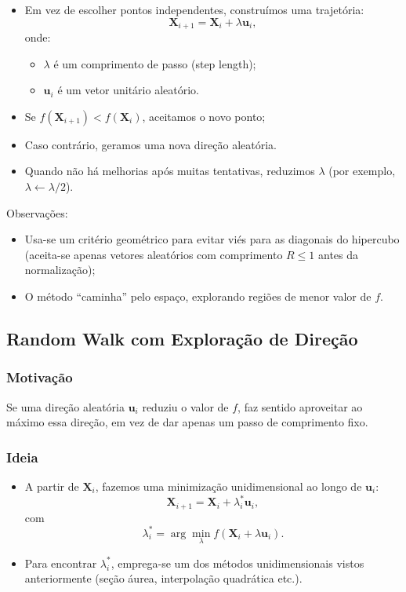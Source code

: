 \documentclass[9pt,a4paper]{extarticle}
\begin{document}
\begin{itemize}
    \item Em vez de escolher pontos independentes, construímos uma trajetória:
    \[
        \bm{X}_{i+1} = \bm{X}_i + \lambda \bm{u}_i,
    \]
    onde:
    \begin{itemize}
        \item $\lambda$ é um comprimento de passo (step length);
        \item $\bm{u}_i$ é um vetor unitário aleatório.
    \end{itemize}
    \item Se $f(\bm{X}_{i+1}) < f(\bm{X}_i)$, aceitamos o novo ponto;
    \item Caso contrário, geramos uma nova direção aleatória.
    \item Quando não há melhorias após muitas tentativas, reduzimos $\lambda$ (por exemplo, $\lambda \leftarrow \lambda/2$).
\end{itemize}

Observações:
\begin{itemize}
    \item Usa-se um critério geométrico para evitar viés para as diagonais do hipercubo (aceita-se apenas vetores aleatórios com comprimento $R \le 1$ antes da normalização);
    \item O método “caminha” pelo espaço, explorando regiões de menor valor de $f$.
\end{itemize}

\subsection{Random Walk com Exploração de Direção}

\subsubsection*{Motivação}

Se uma direção aleatória $\bm{u}_i$ reduziu o valor de $f$, faz sentido aproveitar ao máximo essa direção, em vez de dar apenas um passo de comprimento fixo.

\subsubsection*{Ideia}

\begin{itemize}
    \item A partir de $\bm{X}_i$, fazemos uma minimização unidimensional ao longo de $\bm{u}_i$:
    \[
        \bm{X}_{i+1} = \bm{X}_i + \lambda_i^\ast \bm{u}_i,
    \]
    com
    \[
        \lambda_i^\ast = \arg\min_\lambda f(\bm{X}_i + \lambda \bm{u}_i).
    \]
    \item Para encontrar $\lambda_i^\ast$, emprega-se um dos métodos unidimensionais vistos anteriormente (seção áurea, interpolação quadrática etc.).
\end{itemize}
\end{document}
